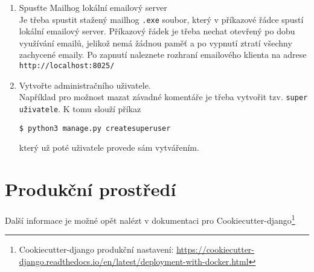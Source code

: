 \begin{enumerate}
    je spuštěn lokální vývojový server spolu s automatickým obnovením stránky při úpravě v HTML šablonách a také automatickou kompilací a doplněním CSS po uložení změn v SASS souboru - v tomto případě bez nutnosti obnovení stránky. Po startu serveru by se mělo automaticky otevřít okno s aplikací. V případě neotevření automaticky by se měla aplikace nacházet na url \url{http://127.0.0.1:8000/}.
    
    \item Spusťte Mailhog lokální emailový server\\
    Je třeba spustit stažený mailhog \texttt{.exe} soubor, který v příkazové řádce spustí lokální emailový server. Příkazový řádek je třeba nechat otevřený po dobu využívání emailů, jelikož nemá žádnou paměť a po vypnutí ztratí všechny zachycené emaily. Po zapnutí naleznete rozhraní emailového klienta na adrese \texttt{http://localhost:8025/}
    
    \item Vytvořte administračního uživatele.\\
    Například pro možnost mazat závadné komentáře je třeba vytvořit tzv. \texttt{super\\ uživatele}. K tomu slouží příkaz

    \texttt{\$ python3 manage.py createsuperuser}

    který už poté uživatele provede sám vytvářením.
    
    
\end{enumerate}




\section{Produkční prostředí}
\label{append:produkce}
Další informace je možné opět nalézt v dokumentaci pro Cookiecutter-django\footnote{Cookiecutter-django produkční nastavení: \url{https://cookiecutter-django.readthedocs.io/en/latest/deployment-with-docker.html}}

